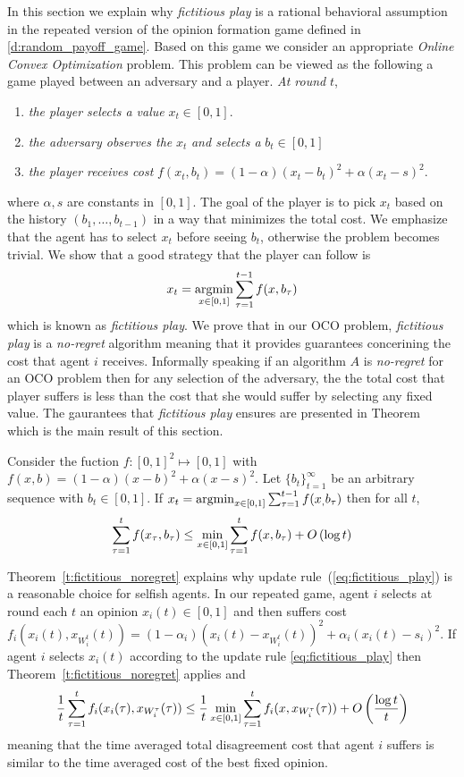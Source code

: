 \noindent In this section we explain why \emph{fictitious play} is a rational behavioral assumption in
the repeated version of the opinion formation game defined in \ref{d:random_payoff_game}. Based on this 
game we consider an appropriate \emph{Online Convex Optimization} problem. This problem can be viewed 
as the following a game played between an adversary and a player. \emph{At round }$t$,
\begin{enumerate}
  \item \emph{the player selects a value }$x_t \in [0,1]$.
  \item \emph{the adversary observes the }$x_t$ \emph{and selects a} $b_t \in [0,1]$
  \item \emph{the player receives cost} $f(x_t,b_t)=(1-\alpha)(x_t-b_t)^2 + \alpha(x_t -s)^2$.
\end{enumerate}
where $\alpha,s$ are constants in $[0,1]$. The goal of the player is to pick $x_t$ based on the history
$(b_1,\ldots,b_{t-1})$ in a way that minimizes the total cost. We emphasize
that the agent has to select $x_t$ before seeing $b_t$, otherwise the
problem becomes trivial. We show that a good strategy that the player can follow is 
\[x_t = \operatorname*{argmin}_{x \in [0,1]}\sum_{\tau=1}^{t-1}f(x,b_\tau)\]
which is known as \emph{fictitious play}. We prove that in our OCO problem,
\emph{fictitious play} is a \emph{no-regret} algorithm meaning that
it provides guarantees concerining the cost that agent $i$ receives. Informally speaking
if an algorithm $A$ is \emph{no-regret} for an OCO problem then for any selection of the
adversary, the the total cost that player suffers is less than 
the cost that she would suffer by selecting any fixed value. The gaurantees that \emph{fictitious play} 
ensures are presented in Theorem~\label{t:fictitious_noregret} which is the main result of this section.
\begin{theorem}\label{t:fictitious_noregret}
Consider the fuction $f:[0,1]^2 \mapsto [0,1]$ with $f(x,b) = (1-\alpha)(x-b)^2 + \alpha(x-s)^2$.
Let $\{b_t\}_{t=1}^\infty$ be an arbitrary sequence with $b_t \in [0,1]$. If $x_t = \operatorname*{argmin}_{x \in [0,1]}\sum_{\tau=1}^{t-1}f(x_,b_\tau)$
then for all $t$, 
\[\sum_{\tau=1}^{t}f(x_\tau,b_\tau) \leq \min_{x \in [0,1]}\sum_{\tau=1}^tf(x,b_\tau) + O\left(\log t\right)\]
\end{theorem}

Theorem~\ref{t:fictitious_noregret} explains why update rule~(\ref{eq:fictitious_play}) is a
reasonable choice for selfish agents. In our repeated game, agent $i$ selects at round each $t$ an opinion
$x_i(t)\in [0,1]$ and then suffers cost $f_i(x_i(t),x_{W_i^t}(t))=(1-\alpha_i)(x_i(t)-x_{W_i^t}(t))^2+\alpha_i(x_i(t)-s_i)^2$. 
If agent $i$ selects $x_i(t)$ according  to the update rule \ref{eq:fictitious_play} then Theorem~\ref{t:fictitious_noregret}
applies and\[\frac{1}{t}\sum_{\tau=1}^t f_i(x_i(\tau),x_{W_i^\tau}(\tau)) \leq
\frac{1}{t}\min_{x \in [0,1]}\sum_{\tau=1}^tf_i(x,x_{W_i^\tau}(\tau)) + O\left(\frac{\log t}{t}\right)\]
meaning that the time averaged total disagreement cost that agent $i$ suffers is similar to the 
time averaged cost of the best fixed opinion.

